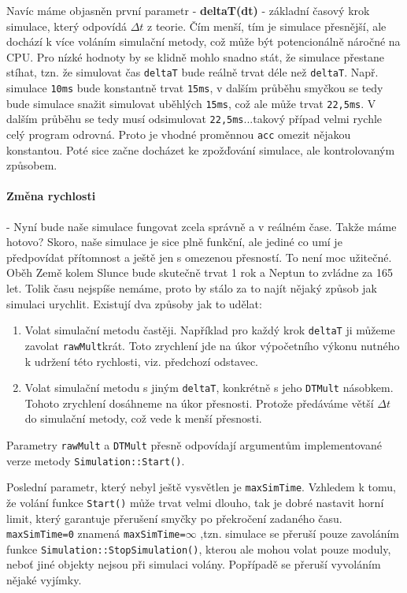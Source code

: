 \label{par:spiral}
Navíc máme objasněn první parametr - \textbf{deltaT(dt)} - základní časový krok simulace, který odpovídá $ \Delta t $ z teorie. Čím menší, tím je simulace přesnější, ale dochází k více voláním simulační metody, což může být potencionálně náročné na CPU.
Pro nízké hodnoty by se klidně mohlo snadno stát, že simulace přestane stíhat, tzn. že simulovat čas \texttt{deltaT} bude reálně trvat déle než \texttt{deltaT}. Např.
simulace \texttt{10ms} bude konstantně trvat \texttt{15ms}, v dalším průběhu smyčkou se tedy bude simulace snažit simulovat uběhlých \texttt{15ms}, což ale může trvat \texttt{22,5ms}. V dalším průběhu se tedy musí odsimulovat \texttt{22,5ms}...takový případ velmi rychle celý program odrovná. Proto je vhodné proměnnou \texttt{acc} omezit nějakou konstantou. Poté sice začne docházet ke zpožďování simulace, ale kontrolovaným způsobem.
\paragraph{Změna rychlosti} - Nyní bude naše simulace fungovat zcela správně a v reálném čase. Takže máme hotovo? Skoro, naše simulace je sice plně funkční, ale jediné co umí je předpovídat přítomnost a ještě jen s omezenou přesností. To není moc užitečné. Oběh Země kolem Slunce bude skutečně trvat 1 rok a Neptun to zvládne za 165 let. Tolik času nejspíše nemáme, proto by stálo za to najít nějaký způsob jak simulaci urychlit. Existují dva způsoby jak to udělat:
\begin{enumerate}
	\item Volat simulační metodu častěji. Například pro každý krok \texttt{deltaT} ji můžeme zavolat \texttt{rawMult}krát. Toto zrychlení jde na úkor výpočetního výkonu nutného k udržení této rychlosti, viz. předchozí odstavec.
	\item Volat simulační metodu s jiným \texttt{deltaT}, konkrétně s jeho \texttt{DTMult} násobkem. Tohoto zrychlení dosáhneme na úkor přesnosti. Protože předáváme větší $ \Delta t $ do simulační metody, což vede k menší přesnosti.
\end{enumerate}
Parametry \texttt{rawMult} a \texttt{DTMult} přesně odpovídají argumentům implementované verze metody \texttt{Simulation::Start()}.

Poslední parametr, který nebyl ještě vysvětlen je \texttt{maxSimTime}. Vzhledem k tomu, že volání funkce \texttt{Start()} může trvat velmi dlouho, tak je dobré nastavit horní limit, který garantuje přerušení smyčky po překročení zadaného času. \texttt{maxSimTime=0} znamená \texttt{maxSimTime=$ \infty $} ,tzn. simulace se přeruší pouze zavoláním funkce \texttt{Simulation::StopSimulation()}, kterou ale mohou volat pouze moduly, neboť jiné objekty nejsou při simulaci volány.
Popřípadě se přeruší vyvoláním nějaké vyjímky.

